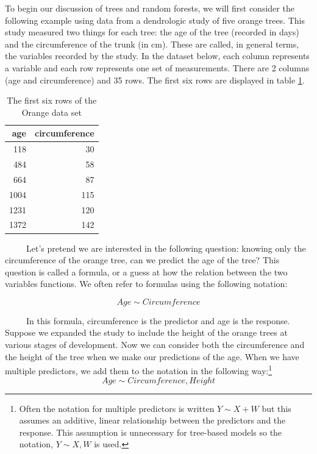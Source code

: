 \documentclass[12pt,twoside]{reedthesis}
\begin{document}
  To begin our discussion of trees and random forests, we will first
  consider the following example using data from a dendrologic study of
  five orange trees. This study measured two things for each tree: the age
  of the tree (recorded in days) and the circumference of the trunk (in
  cm). These are called, in general terms, the variables recorded by the
  study. In the dataset below, each column represents a variable and each
  row represents one set of measurements. There are 2 columns (age and
  circumference) and 35 rows. The first six rows are displayed in table
  \ref{tab:taborange}.
  
  \begin{table}
  
  \caption{\label{tab:unnamed-chunk-1}\label{tab:taborange}The first six rows of the Orange data set}
  \centering
  \begin{tabular}[t]{r|r}
  \hline
  age & circumference\\
  \hline
  118 & 30\\
  \hline
  484 & 58\\
  \hline
  664 & 87\\
  \hline
  1004 & 115\\
  \hline
  1231 & 120\\
  \hline
  1372 & 142\\
  \hline
  \end{tabular}
  \end{table}
  
  ~~~~~Let's pretend we are interested in the following question: knowing
  only the circumference of the orange tree, can we predict the age of the
  tree? This question is called a formula, or a guess at how the relation
  between the two variables functions. We often refer to formulas using
  the following notation:
  
  \[Age \sim Circumference \]
  
  ~~~~~In this formula, circumference is the predictor and age is the
  response. Suppose we expanded the study to include the height of the
  orange trees at various stages of development. Now we can consider both
  the circumference and the height of the tree when we make our
  predictions of the age. When we have multiple predictors, we add them to
  the notation in the following way:\footnote{Often the notation for
    multiple predictors is written \(Y \sim X+W\) but this assumes an
    additive, linear relationship between the predictors and the response.
    This assumption is unnecessary for tree-based models so the notation,
    \(Y\sim X,W\) is used.} \[Age \sim Circumference, Height\]
  
\end{document}
